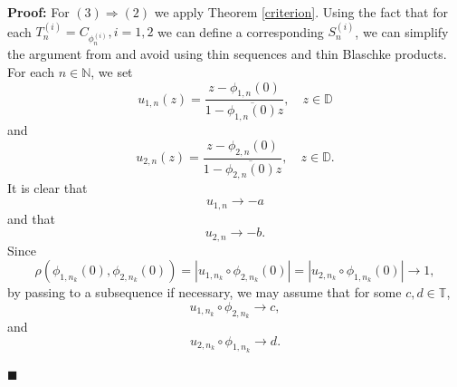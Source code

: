 \documentclass[12pt,a4paper]{amsart}
\theoremstyle{plain}
\theoremstyle{definition}
\theoremstyle{remark}
\theoremstyle{fact}
\newenvironment{pf}
{\noindent\textbf{Proof:}}
{\hfill $\blacksquare$\par\medskip}
\begin{document}
\begin{pf}
        For $(3)\Rightarrow (2)$ we apply Theorem \ref{criterion}. Using the fact that for each $T^{(i)}_n=C_{\phi^{(i)}_n}, i=1,2$ we can define a corresponding $S^{(i)}_n$, we can simplify the argument from \cite[Theorem 2.1]{BGGM09} and avoid using thin sequences and thin Blaschke products. For each $n\in \mathbb{N}$, we set
        $$
        u_{1, n}(z)=\frac{z-\phi_{1, n}(0)}{1-\overline{\phi_{1, n}(0)}z},\quad z\in \mathbb{D}
        $$
        and 
        $$
         u_{2, n}(z)=\frac{z-\phi_{2, n}(0)}{1-\overline{\phi_{2, n}(0)}z},\quad z\in \mathbb{D}.
        $$
        It is clear that
         $$
        u_{1, n}\rightarrow -a
        $$
        and that
        $$
        u_{2, n}\rightarrow -b.
        $$
        Since
        $$
        \rho(\phi_{1,n_k}(0),\phi_{2,n_k}(0))=|u_{1, n_k}\circ \phi_{2, n_k}(0)|=|u_{2, n_k}\circ \phi_{1, n_k}(0)|\rightarrow 1,
        $$
        by passing to a subsequence if necessary, we may assume that for some $c, d\in \mathbb{T}$,
        $$
        u_{1, n_k}\circ \phi_{2, n_k}\rightarrow c,
        $$
        and
        $$
        u_{2, n_k}\circ \phi_{1, n_k}\rightarrow d.
        $$
        

\end{pf}
\end{document}
